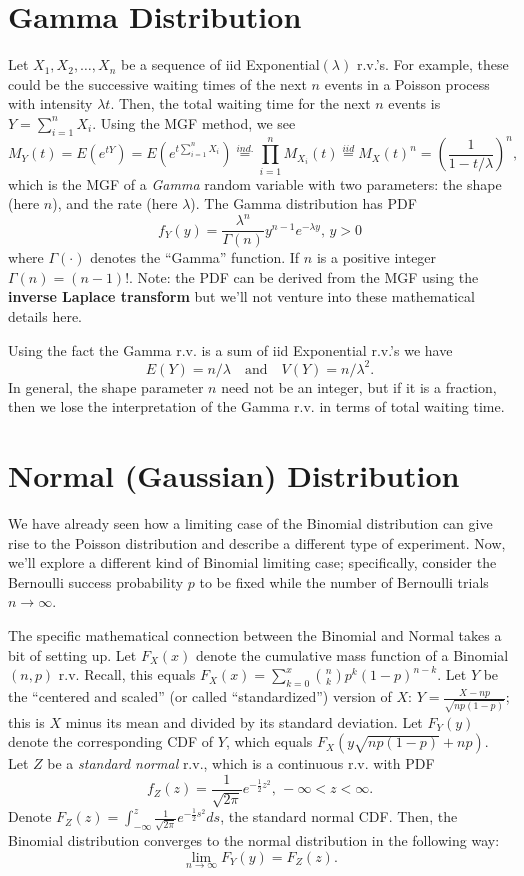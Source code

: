\documentclass[
]{book}
\begin{document}
\hypertarget{gamma-distribution}{%
\section{Gamma Distribution}\label{gamma-distribution}}

Let \(X_1, X_2, \ldots, X_n\) be a sequence of iid Exponential\((\lambda)\) r.v.'s. For example, these could be the successive waiting times of the next \(n\) events in a Poisson process with intensity \(\lambda t\). Then, the total waiting time for the next \(n\) events is \(Y = \sum_{i=1}^n X_i\). Using the MGF method, we see
\[M_Y(t) = E(e^{tY}) = E(e^{t \sum_{i=1}^n X_i}) \stackrel{ind.}{=}\prod_{i=1}^n M_{X_i}(t)\stackrel{iid}{=}M_X(t)^n = \left(\frac{1}{1-t/\lambda}\right)^n,\]
which is the MGF of a \emph{Gamma} random variable with two parameters: the shape (here \(n\)), and the rate (here \(\lambda\)). The Gamma distribution has PDF
\[f_Y(y) = \frac{\lambda^n}{\Gamma(n)}y^{n-1}e^{-\lambda y},\, y>0\]
where \(\Gamma(\cdot)\) denotes the ``Gamma'' function. If \(n\) is a positive integer \(\Gamma(n) = (n-1)!\). Note: the PDF can be derived from the MGF using the \textbf{inverse Laplace transform} but we'll not venture into these mathematical details here.

Using the fact the Gamma r.v. is a sum of iid Exponential r.v.'s we have
\[E(Y) = n/\lambda \quad\text{and}\quad V(Y) = n/\lambda^2.\]
In general, the shape parameter \(n\) need not be an integer, but if it is a fraction, then we lose the interpretation of the Gamma r.v. in terms of total waiting time.

\hypertarget{normal-gaussian-distribution}{%
\section{Normal (Gaussian) Distribution}\label{normal-gaussian-distribution}}

We have already seen how a limiting case of the Binomial distribution can give rise to the Poisson distribution and describe a different type of experiment. Now, we'll explore a different kind of Binomial limiting case; specifically, consider the Bernoulli success probability \(p\) to be fixed while the number of Bernoulli trials \(n\rightarrow \infty\).

The specific mathematical connection between the Binomial and Normal takes a bit of setting up. Let \(F_X(x)\) denote the cumulative mass function of a Binomial\((n,p)\) r.v. Recall, this equals \(F_X(x) = \sum_{k=0}^x {n\choose k}p^k(1-p)^{n-k}\). Let \(Y\) be the ``centered and scaled'' (or called ``standardized'') version of \(X\): \(Y = \frac{X - np}{\sqrt{np(1-p)}}\); this is \(X\) minus its mean and divided by its standard deviation. Let \(F_Y(y)\) denote the corresponding CDF of \(Y\), which equals \(F_X(y\sqrt{np(1-p)}+np)\). Let \(Z\) be a \emph{standard normal} r.v., which is a continuous r.v. with PDF \[f_Z(z) = \frac{1}{\sqrt{2\pi}}e^{-\frac{1}{2}z^2}, \, -\infty < z < \infty.\]
Denote \(F_Z(z) = \int_{-\infty}^z \frac{1}{\sqrt{2\pi}}e^{-\frac{1}{2}s^2}ds\), the standard normal CDF. Then, the Binomial distribution converges to the normal distribution in the following way:
\[\lim_{n\rightarrow\infty} F_Y(y) = F_Z(z).\]
\end{document}
